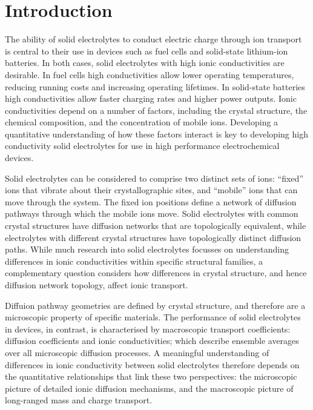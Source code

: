 \documentclass[aps,prb,twocolumn,superscriptaddress,reprint]{revtex4-1}
\begin{document}
\maketitle

\section{Introduction}

The ability of solid electrolytes to conduct electric charge through ion transport is central to their use in devices such as fuel cells and solid-state lithium-ion batteries.\cite{BachmanEtAl_ChemRev2016, ManthiramEtAl_NatRevMater2017,GoodenoughAndSingh_JElectrochemSoc2015, MalavasiEtAl_ChemSocRev2010} In both cases, solid electrolytes with high ionic conductivities are desirable. In fuel cells high conductivities allow lower operating temperatures, reducing running costs and increasing operating lifetimes. In solid-state batteries high conductivities allow faster charging rates and higher power outputs. Ionic conductivities depend on a number of factors, including the crystal structure, the chemical composition, and the concentration of mobile ions.\cite{VanDerVenEtAl_AccChemRes2013} Developing a quantitative understanding of how these factors interact is key to developing high conductivity solid electrolytes for use in high performance electrochemical devices.

Solid electrolytes can be considered to comprise two distinct sets of ions: ``fixed'' ions that vibrate about their crystallographic sites, and ``mobile'' ions that can move through the system. The fixed ion positions define a network of diffusion pathways through which the mobile ions move. Solid electrolytes with common crystal structures have diffusion networks that are topologically equivalent, while electrolytes with different crystal structures have topologically distinct diffusion paths. While much research into solid electrolytes focusses on understanding differences in ionic conductivities within specific structural families, a complementary question considers how differences in crystal structure, and hence diffusion network topology, affect ionic transport.

Diffuion pathway geometries are defined by crystal structure, and therefore are  a microscopic property of specific materials. The performance of solid electrolytes in devices, in contrast, is characterised by macroscopic transport coefficients: diffusion coefficients and ionic conductivities; which describe ensemble averages over all microscopic diffusion processes. A meaningful understanding of differences in ionic conductivity between solid electrolytes therefore depends on the quantitative relationships that link these two perspectives: the microscopic picture of detailed ionic diffusion mechanisms, and the macroscopic picture of long-ranged mass and charge transport.
\end{document}
